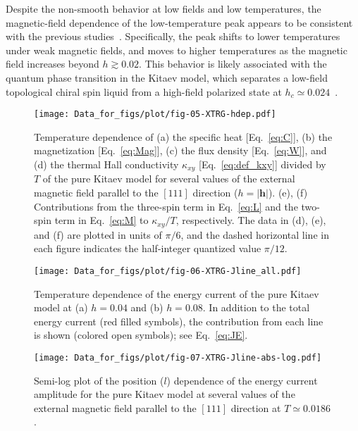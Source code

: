 \documentclass[twocolumn,superscriptaddress,showpacs, longbibliography, aps, prx]{revtex4-2}
\begin{document}
Despite the non-smooth behavior at low fields and low temperatures, the magnetic-field dependence of the low-temperature peak appears to be consistent with the previous studies~\cite{YoshitakeNKM2020,Li2020,LiZWWGQLGL2021,LiLXGQLS2024}. 
Specifically, the peak shifts to lower temperatures under weak magnetic fields, and moves to higher temperatures as the magnetic field increases beyond $h \gtrsim 0.02$.
This behavior is likely associated with the quantum phase transition in the Kitaev model, which separates a low-field topological chiral spin liquid from a high-field polarized state at $h_c \simeq 0.024$~\cite{Gohlke2018}. 

\begin{figure}
  \begin{center}
    \texttt{[image: Data\_for\_figs/plot/fig-05-XTRG-hdep.pdf]}
  \end{center}
  \caption{Temperature dependence of (a) the specific heat [Eq.~\eqref{eq:C}], (b) the magnetization [Eq.~\eqref{eq:Mag}], (c) the flux density [Eq.~\eqref{eq:W}], and (d) the thermal Hall conductivity $\kappa_{xy}$ [Eq.~\eqref{eq:def_kxy}] divided by $T$ of the pure Kitaev model for several values of the external magnetic field parallel to the $[111]$ direction ($h=|\bm{h}|$). (e), (f) Contributions from the three-spin term in Eq.~\eqref{eq:L} and the two-spin term in Eq.~\eqref{eq:M} to $\kappa_{xy}/T$, respectively. The data in (d), (e), and (f) are plotted in units of $\pi/6$, and the dashed horizontal line in each figure indicates the half-integer quantized value $\pi/12$.
  }
  \label{fig:CMF_pure}
\end{figure}

\begin{figure}[htb]
  \begin{center}
    \texttt{[image: Data\_for\_figs/plot/fig-06-XTRG-Jline\_all.pdf]}
  \end{center}
  \caption{Temperature dependence of the energy current of the pure Kitaev model at (a) $h=0.04$ and (b) $h=0.08$. In addition to the total energy current (red filled symbols), the contribution from each line is shown (colored open symbols); see Eq.~\eqref{eq:JE}.
}
  \label{fig:J_line}
\end{figure}

\begin{figure}[htb]
  \begin{center}
    \texttt{[image: Data\_for\_figs/plot/fig-07-XTRG-Jline-abs-log.pdf]}
  \end{center}
  \caption{Semi-log plot of the position ($l$) dependence of the energy current amplitude for the pure Kitaev model at several values of the external magnetic field parallel to the $[111]$ direction at $T \simeq 0.0186$.} 
  \label{fig:J_line_dep}
\end{figure}
\end{document}
